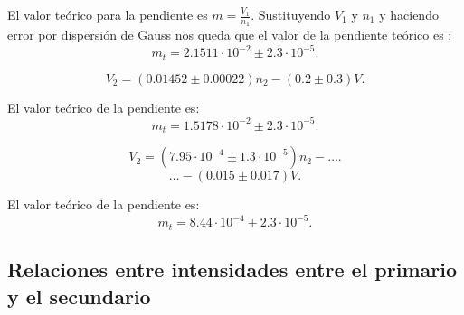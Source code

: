 \documentclass[11pt,letterpaper,twocolumn]{article}
\begin{document}
		El valor teórico para la pendiente es $m=\frac{V_1}{n_1}$. Sustituyendo $V_1$ y $n_1$ y haciendo error por dispersión de Gauss nos queda que el valor de la pendiente teórico es :
		\[
			m_{t}= 2.1511 \cdot 10^{-2} \pm 2.3 \cdot 10^{-5}
		.\] 
		\begin{tcolorbox}[colback=red!5!white,colframe=red!75!black,fonttitle=\bfseries,title=\[
		V_1 :6.64V 
		.\] ]
		\[
			V_2=\left(0.01452 \pm 0.00022 \right) n_2-  \left( 0.2 \pm 0.3 \right) V
		.\]  
		\end{tcolorbox}
		El valor teórico de la pendiente es:
		\[
			m_t=1.5178 \cdot 10^{-2} \pm 2.3 \cdot 10^{-5}
		.\] 

	\begin{tcolorbox}[colback=blue!5!white,colframe=blue!75!black,fonttitle=\bfseries,title= \[
	V_1: 0.38 V
	.\] ]
		\[
			V_2=\left( 7.95 \cdot 10^{-4} \pm 1.3 \cdot 10^{-5} \right) n_2 - \ldots 
		.\] 	 
		\[	
		\ldots-\left( 0.015 \pm 0.017 \right) V
		.\] 
\end{tcolorbox}
El valor teórico de la pendiente es:
\[
	m_t=8.44 \cdot 10^{-4} \pm 2.3 \cdot 10^{-5}
.\]
		\subsection{Relaciones entre intensidades entre el primario y el secundario}
\end{document}
